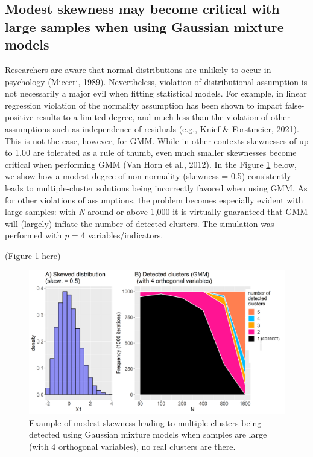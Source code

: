 \documentclass[
  man,floatsintext]{apa6}
\begin{document}
\hypertarget{modest-skewness-may-become-critical-with-large-samples-when-using-gaussian-mixture-models}{%
\subsection{Modest skewness may become critical with large samples when using Gaussian mixture models}\label{modest-skewness-may-become-critical-with-large-samples-when-using-gaussian-mixture-models}}

Researchers are aware that normal distributions are unlikely to occur in psychology (Micceri, 1989). Nevertheless, violation of distributional assumption is not necessarily a major evil when fitting statistical models. For example, in linear regression violation of the normality assumption has been shown to impact false-positive results to a limited degree, and much less than the violation of other assumptions such as independence of residuals (e.g., Knief \& Forstmeier, 2021). This is not the case, however, for GMM. While in other contexts skewnesses of up to 1.00 are tolerated as a rule of thumb, even much smaller skewnesses become critical when performing GMM (Van Horn et al., 2012). In the Figure \ref{fig:figure-modest-skewness} below, we show how a modest degree of non-normality (skewness = 0.5) consistently leads to multiple-cluster solutions being incorrectly favored when using GMM. As for other violations of assumptions, the problem becomes especially evident with large samples: with \emph{N} around or above 1,000 it is virtually guaranteed that GMM will (largely) inflate the number of detected clusters. The simulation was performed with \emph{p} = 4 variables/indicators.

(Figure \ref{fig:figure-modest-skewness} here)

\begin{figure}

{\centering \includegraphics[width=1\linewidth]{figures_external/Figure_modest_skewness} 

}

\caption{Example of modest skewness leading to multiple clusters being detected using Gaussian mixture models when samples are large (with 4 orthogonal variables), no real clusters are there.}\label{fig:figure-modest-skewness}
\end{figure}
\end{document}
